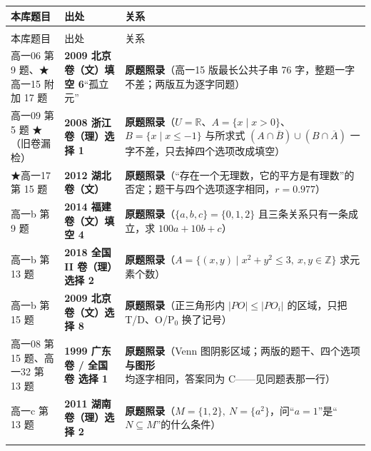 \documentclass[a4paper,11pt]{article}
\begin{document}
\newcommand{\tabhdrI}{\rowcolor{white} 本库题目 & 出处 & 关系 \\}
\begin{xltabular}{\textwidth}{@{}>{\raggedright\arraybackslash}p{2.85cm}>{\raggedright\arraybackslash}p{3.99cm}>{\raggedright\arraybackslash}p{7.89cm}@{}}
\toprule
\tabhdrI
\midrule
\endfirsthead
{} \\
\midrule
\tabhdrI
\midrule
\endhead
\bottomrule
\endlastfoot
高一06 第 9 题、★高一15 附加 17 题 & \textbf{2009 北京卷（文）填空 6}``孤立元'' & \textbf{原题照录}（高一15 版最长公共子串 76 字，整题一字不差；两版互为逐字同题） \\ \addlinespace[1pt]
高一09 第 5 题 ★（旧卷漏检） & \textbf{2008 浙江卷（理）选择 1} & \textbf{原题照录}（\(U=\allowbreak \mathbb{R}\)、\(A=\allowbreak \{x\mid\allowbreak  x>0\}\)、\(B=\allowbreak \{x\mid\allowbreak  x\leqslant\allowbreak -1\}\) 与所求式 \((A\cap\allowbreak \overline{B})\cup\allowbreak (B\cap\allowbreak \overline{A})\) 一字不差，只去掉四个选项改成填空） \\ \addlinespace[1pt]
★高一17 第 15 题 & \textbf{2012 湖北卷（文）} & \textbf{原题照录}（``存在一个无理数，它的平方是有理数''的否定；题干与四个选项逐字相同，\(r=\allowbreak 0.977\)） \\ \addlinespace[1pt]
高一b 第 9 题 & \textbf{2014 福建卷（文）填空 4} & \textbf{原题照录}（\(\{a,b,c\}=\allowbreak \{0,\allowbreak 1,\allowbreak 2\}\) 且三条关系只有一条成立，求 \(100a+\allowbreak 10b+c\)） \\ \addlinespace[1pt]
高一b 第 13 题 & \textbf{2018 全国 II 卷（理）选择 2} & \textbf{原题照录}（\(A=\allowbreak \{(x,y)\mid\allowbreak  x^2+y^2\leqslant\allowbreak  3,\allowbreak \ x,y\in\mathbb{Z}\}\) 求元素个数） \\ \addlinespace[1pt]
高一b 第 15 题 & \textbf{2009 北京卷（文）选择 8} & \textbf{原题照录}（正三角形内 \(\lvert PO\rvert\leqslant\allowbreak \lvert PO_i\rvert\) 的区域，只把 T/D、O/P$_{0}$ 换了记号） \\ \addlinespace[1pt]
高一08 第 15 题、高一32 第 13 题 & \textbf{1999 广东卷 / 全国卷 选择 1} & \textbf{原题照录}（Venn 图阴影区域；两版的题干、四个选项\textbf{与图形}均逐字相同，答案同为 C------见同题表那一行） \\ \addlinespace[1pt]
高一c 第 13 题 & \textbf{2011 湖南卷（理）选择 2} & \textbf{原题照录}（\(M=\allowbreak \{1,\allowbreak 2\},\allowbreak \ N=\allowbreak \{a^2\}\)，问``\(a=\allowbreak 1\)''是``\(N\subseteq\allowbreak  M\)''的什么条件） \\ \addlinespace[1pt]

\end{xltabular}
\end{document}
